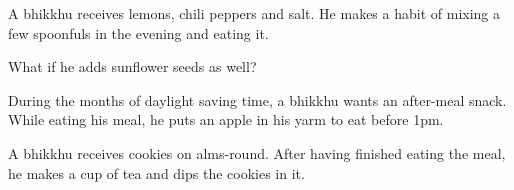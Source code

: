 \bigskip

A bhikkhu receives lemons, chili peppers and salt. He makes a habit of mixing a
few spoonfuls in the evening and eating it.

\bigskip

What if he adds sunflower seeds as well?

\bigskip

During the months of daylight saving time, a bhikkhu wants an after-meal snack.
While eating his meal, he puts an apple in his yarm to eat before 1pm.

\bigskip

A bhikkhu receives cookies on alms-round. After having finished eating the meal, he makes a cup of tea and
dips the cookies in it.
